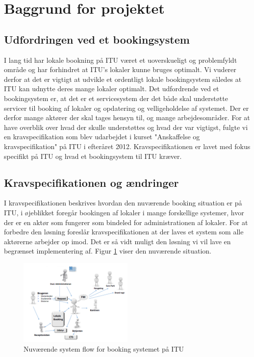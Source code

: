\chapter{Baggrund for projektet}
\section{Udfordringen ved et bookingsystem}
\label{Baggrund_Udfording}
I lang tid har lokale bookning på ITU været et uoverskueligt og problemfyldt område og har forhindret at ITU's lokaler kunne bruges optimalt. Vi vuderer derfor at det er vigtigt at udvikle et ordentligt lokale bookingsystem således at ITU kan udnytte deres mange lokaler optimalt. Det udfordrende ved et bookingsystem er, at det er et servicesystem der det både skal understøtte servicer til booking af lokaler og opdatering og velligeholdelse af systemet. Der er derfor mange aktører der skal tages hensyn til, og mange arbejdesområder. For at have overblik over hvad der skulle understøttes og hvad der var vigtigst, fulgte vi en kravspecifikation som blev udarbejdet i kurset "Anskaffelse og kravspecifikation" på ITU i efteråret 2012. Kravspecifikationen er lavet med fokus specifikt på ITU og hvad et bookingsystem til ITU kræver.
\section{Kravspecifikationen og ændringer}
\label{Baggrund_kravspecifikationen}
I kravspecifikationen beskrives hvordan den nuværende booking situation er på ITU, i øjeblikket foregår bookingen af lokaler i mange forskellige systemer, hvor der er en aktør som fungerer som bindeled for administrationen af lokaler. For at forbedre den løsning foreslår kravspecifikationen at der laves et system som alle aktørerne arbejder op imod. Det er så vidt muligt den løsning vi vil lave en begrænset implementering af. Figur \ref{} viser den nuværende situation.

\begin{figure}[h!]
  \centering
    \includegraphics[width=0.5\textwidth]{Appendix/GUI-Prototype/NuvaerendeFlow}
  \caption{Nuværende system flow for booking systemet på ITU}
\label{Baggrund_kravspecifikationen_NuvaerendeFlow}
\end{figure}

